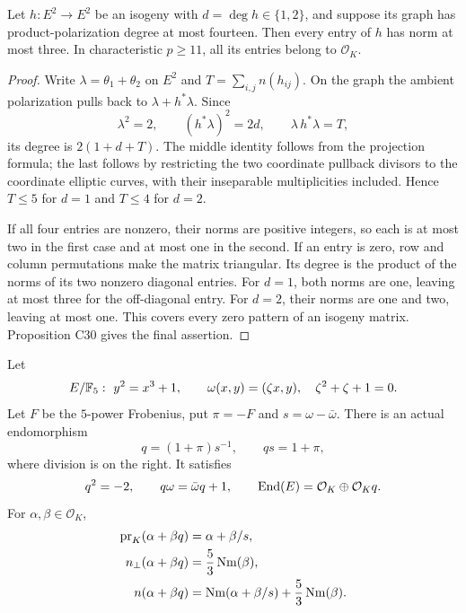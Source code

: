 \begin{proposition}
Let $h:E^2\to E^2$ be an isogeny with $d=\deg h\in\{1,2\}$, and suppose its graph has product-polarization degree at most fourteen. Then every entry of $h$ has norm at most three. In characteristic $p\geq11$, all its entries belong to $\mathcal O_K$.
\end{proposition}

\begin{proof}
Write $\lambda=\theta_1+\theta_2$ on $E^2$ and $T=\sum_{i,j}n(h_{ij})$. On the graph the ambient polarization pulls back to $\lambda+h^*\lambda$. Since
\[
\lambda^2=2,\qquad (h^*\lambda)^2=2d,
\qquad \lambda\,h^*\lambda=T,
\]
its degree is $2(1+d+T)$. The middle identity follows from the projection formula; the last follows by restricting the two coordinate pullback divisors to the coordinate elliptic curves, with their inseparable multiplicities included. Hence $T\leq5$ for $d=1$ and $T\leq4$ for $d=2$.

If all four entries are nonzero, their norms are positive integers, so each is at most two in the first case and at most one in the second. If an entry is zero, row and column permutations make the matrix triangular. Its degree is the product of the norms of its two nonzero diagonal entries. For $d=1$, both norms are one, leaving at most three for the off-diagonal entry. For $d=2$, their norms are one and two, leaving at most one. This covers every zero pattern of an isogeny matrix. Proposition C30 gives the final assertion.
\end{proof}

\begin{proposition}
Let
\[
E/\mathbb F_5:\ y^2=x^3+1,\qquad
\omega(x,y)=(\zeta x,y),\quad \zeta^2+\zeta+1=0.
\]
Let $F$ be the $5$-power Frobenius, put $\pi=-F$ and $s=\omega-\bar\omega$. There is an actual endomorphism
\[
q=(1+\pi)s^{-1},\qquad qs=1+\pi,
\]
where division is on the right. It satisfies
\[
q^2=-2,\qquad q\omega=\bar\omega q+1,
\qquad \operatorname{End}(E)=\mathcal O_K\oplus\mathcal O_Kq.
\]
For $\alpha,\beta\in\mathcal O_K$,
\begin{align*}
\operatorname{pr}_K(\alpha+\beta q)&=\alpha+\beta/s,\\
n_\perp(\alpha+\beta q)&=\frac53\operatorname{Nm}(\beta),\\
n(\alpha+\beta q)&=\operatorname{Nm}(\alpha+\beta/s)+\frac53\operatorname{Nm}(\beta).
\end{align*}
\end{proposition}

